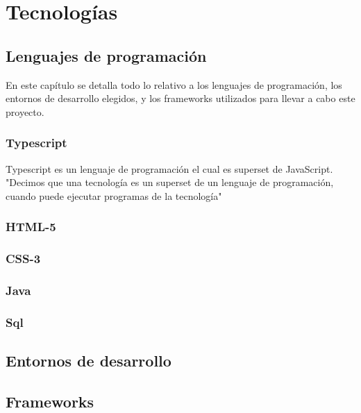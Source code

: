 \chapter{Tecnologías}
    \section{Lenguajes de programación}
    
    En este capítulo se detalla todo lo relativo a los lenguajes de programación,
    los entornos de desarrollo elegidos, y los frameworks utilizados para llevar a cabo 
    este proyecto. \\
    
    \subsection{Typescript}
        Typescript es un lenguaje de programación el cual es superset de JavaScript. 
        "Decimos que una tecnología es un superset de un lenguaje de programación, cuando puede ejecutar programas de la tecnología" \cite{goossens93}
    \subsection{HTML-5}
    \subsection{CSS-3}
    \subsection{Java}
    \subsection{Sql}
    
     \section{Entornos de desarrollo}
     
     \section{Frameworks}
     
